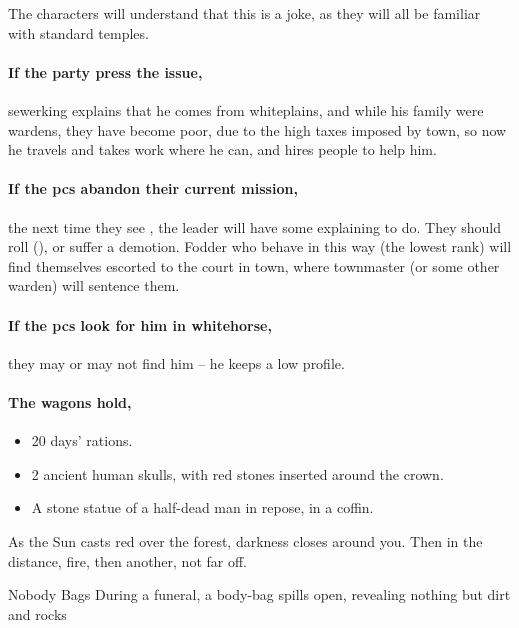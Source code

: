 The characters will understand that this is a joke, as they will all be familiar with standard temples.

\paragraph{If the party press the issue,}
\gls{sewerking} explains that he comes from \gls{whiteplains}, and while his family were \glspl{warden}, they have become poor, due to the high taxes imposed by \gls{town}, so now he travels and takes work where he can, and hires people to help him.

\paragraph{If the \glspl{pc} abandon their current mission,}
the next time they see , the leader will have some explaining to do.
They should roll  (\tn[12]), or suffer a demotion.
Fodder who behave in this way (the lowest rank) will find themselves escorted to the \gls{court} in \gls{town}, where \gls{townmaster} (or some other \gls{warden}) will sentence them.%

\paragraph{If the \glspl{pc} look for him in \gls{whitehorse},}
they may or may not find him -- he keeps a low profile.

\paragraph{The wagons hold,}

\begin{itemize}
  \item
  20 days' rations.
  \item
  2 ancient human skulls, with red stones inserted around the crown.
  \label{skullCrown}
  \item
  A stone statue of a half-dead man in repose, in a coffin.
\end{itemize}

\begin{boxtext}
  As the Sun casts red over the forest, darkness closes around you.
  Then in the distance, fire, then another, not far off.
\end{boxtext}

  {Nobody Bags}%
  {During a funeral, a body-bag spills open, revealing nothing but dirt and rocks}%

